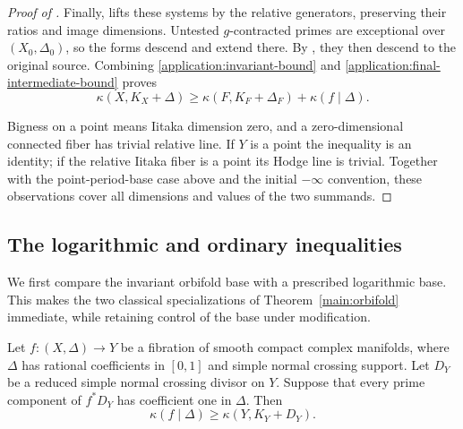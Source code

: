 \begin{proof}[Proof of ]
Finally,  lifts these systems by the relative
generators, preserving their ratios and image dimensions. Untested
\(g\)-contracted primes are exceptional over \((X_0,\Delta_0)\),
so the forms descend and extend there. By
, they then descend to the original source.
Combining \eqref{application:invariant-bound} and
\eqref{application:final-intermediate-bound} proves
\[
 \kappa(X,K_X+\Delta)
     \geq \kappa(F,K_F+\Delta_F)+\kappa(f\mid\Delta).
\]

Bigness on a point means Iitaka dimension zero, and a zero-dimensional
connected fiber has trivial relative line. If \(Y\) is a point the
inequality is an identity; if the relative Iitaka fiber is a point its
Hodge line is trivial. Together with the point-period-base case above
and the initial \(-\infty\) convention, these observations cover all
dimensions and values of the two summands.
\end{proof}

\subsection{The logarithmic and ordinary inequalities}
\label{spec:section}

We first compare the invariant orbifold base with a prescribed
logarithmic base.  This makes the two classical specializations of
Theorem~\ref{main:orbifold} immediate, while retaining control of the
base under modification.

\begin{lemma}
\label{spec:base-comparison}
Let $f:(X,\Delta)\to Y$ be a fibration of smooth compact complex
manifolds, where $\Delta$ has rational coefficients in $[0,1]$ and
simple normal crossing support.  Let $D_Y$ be a reduced simple normal
crossing divisor on $Y$.  Suppose that every prime component of
$f^*D_Y$ has coefficient one in $\Delta$.  Then
\[
  \kappa(f\mid\Delta)\geq\kappa(Y,K_Y+D_Y).
\]
\end{lemma}

